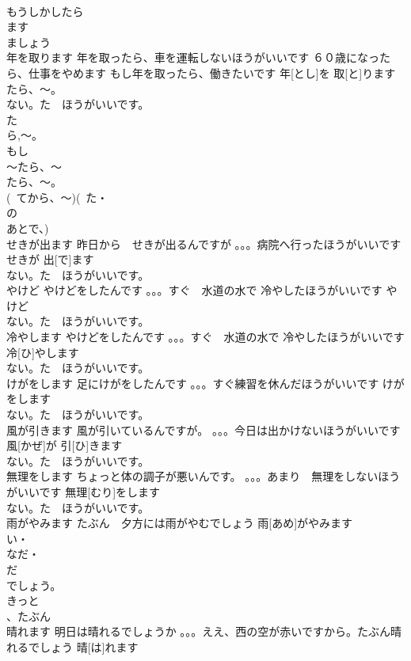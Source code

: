 \documentclass[8pt]{extreport}
\begin{document}
\begin{CJK}{UTF8}{min}
\\	もうしかしたら
\\	ます
\\	ましょう
\\	年を取ります	年を取ったら、車を運転しないほうがいいです ６０歳になったら、仕事をやめます もし年を取ったら、働きたいです	年[とし]を 取[と]ります			
\\	たら、～。
\\	ない。た　ほうがいいです。
\\	た
\\	ら,～。
\\	もし
\\	～たら、～ 
\\	たら、～。
\\	(~てから、～)(~た・
\\	の
\\	あとで、)		
\\	せきが出ます	昨日から　せきが出るんですが 。。。病院へ行ったほうがいいです	せきが 出[で]ます			
\\	ない。た　ほうがいいです。
\\	やけど	やけどをしたんです 。。。すぐ　水道の水で 冷やしたほうがいいです	やけど			
\\	ない。た　ほうがいいです。
\\	冷やします	やけどをしたんです 。。。すぐ　水道の水で 冷やしたほうがいいです	冷[ひ]やします			
\\	ない。た　ほうがいいです。
\\	けがをします	足にけがをしたんです 。。。すぐ練習を休んだほうがいいです	けがをします			
\\	ない。た　ほうがいいです。
\\	風が引きます	風が引いているんですが。 。。。今日は出かけないほうがいいです	風[かぜ]が 引[ひ]きます			
\\	ない。た　ほうがいいです。
\\	無理をします	ちょっと体の調子が悪いんです。 。。。あまり　無理をしないほうがいいです	無理[むり]をします			
\\	ない。た　ほうがいいです。
\\	雨がやみます	たぶん　夕方には雨がやむでしょう	雨[あめ]がやみます			
\\	い・
\\	なだ・
\\	だ
\\	でしょう。
\\	きっと
\\	、たぶん
\\	晴れます	明日は晴れるでしょうか 。。。ええ、西の空が赤いですから。たぶん晴れるでしょう	晴[は]れます			

\end{CJK}
\end{document}
